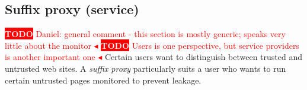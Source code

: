 \documentclass{llncs}
\newcommand{\todo}[1]{\colorbox{red}{\textcolor{white}{\sffamily\bfseries\scriptsize TODO}} \textcolor{red}{#1} \textcolor{red}{$\blacktriangleleft$}}
\begin{document}
\subsection{Suffix proxy (service)}
\todo{Daniel: general comment - this section is mostly generic; speaks very little about the monitor}
\todo{Users is one perspective, but  service providers is another
  important one}
Certain users want to distinguish between trusted and untrusted web sites.
A \emph{suffix proxy} particularly suits a user who wants to run certain untrusted 
pages monitored to prevent leakage.
\end{document}
